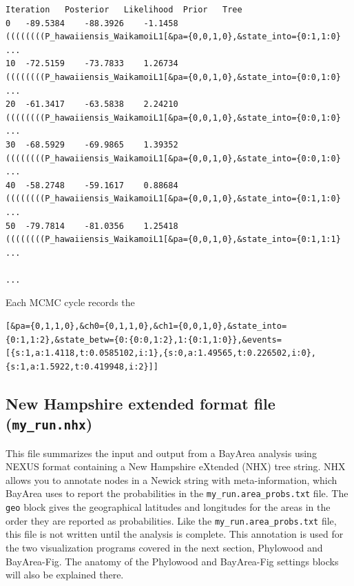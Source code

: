 \documentclass[11pt]{article}
\begin{document}
\begin{framed}
\begin{lstlisting}[basicstyle=\tiny \listingsfont, columns=texcl]
Iteration	Posterior	Likelihood	Prior	Tree
0	-89.5384	-88.3926	-1.1458	((((((((P_hawaiiensis_WaikamoiL1[&pa={0,0,1,0},&state_into={0:1,1:0} ...
10	-72.5159	-73.7833	1.26734	((((((((P_hawaiiensis_WaikamoiL1[&pa={0,0,1,0},&state_into={0:0,1:0} ...
20	-61.3417	-63.5838	2.24210	((((((((P_hawaiiensis_WaikamoiL1[&pa={0,0,1,0},&state_into={0:0,1:0} ...
30	-68.5929	-69.9865	1.39352	((((((((P_hawaiiensis_WaikamoiL1[&pa={0,0,1,0},&state_into={0:0,1:0} ...
40	-58.2748	-59.1617	0.88684	((((((((P_hawaiiensis_WaikamoiL1[&pa={0,0,1,0},&state_into={0:1,1:0} ...
50	-79.7814	-81.0356	1.25418	((((((((P_hawaiiensis_WaikamoiL1[&pa={0,0,1,0},&state_into={0:1,1:1} ...

...
\end{lstlisting}
\end{framed}

Each MCMC cycle records the 

\begin{snugshade}
\begin{lstlisting}
[&pa={0,1,1,0},&ch0={0,1,1,0},&ch1={0,0,1,0},&state_into={0:1,1:2},&state_betw={0:{0:0,1:2},1:{0:1,1:0}},&events=[{s:1,a:1.4118,t:0.0585102,i:1},{s:0,a:1.49565,t:0.226502,i:0},{s:1,a:1.5922,t:0.419948,i:2}]]
\end{lstlisting}
\end{snugshade}

\subsection{New Hampshire extended format file (\texttt{my\_run.nhx})}

This file summarizes the input and output from a BayArea analysis using NEXUS format containing a New Hampshire eXtended (NHX) tree string.
NHX allows you to annotate nodes in a Newick string with meta-information, which BayArea uses to report the probabilities in the \texttt{my\_run.area\_probs.txt} file.
The \texttt{geo} block gives the geographical latitudes and longitudes for the areas in the order they are reported as probabilities.
Like the \texttt{my\_run.area\_probs.txt} file, this file is not written until the analysis is complete.
This annotation is used for the two visualization programs covered in the next section, Phylowood and BayArea-Fig.
The anatomy of the Phylowood and BayArea-Fig settings blocks will also be explained there.
\end{document}
